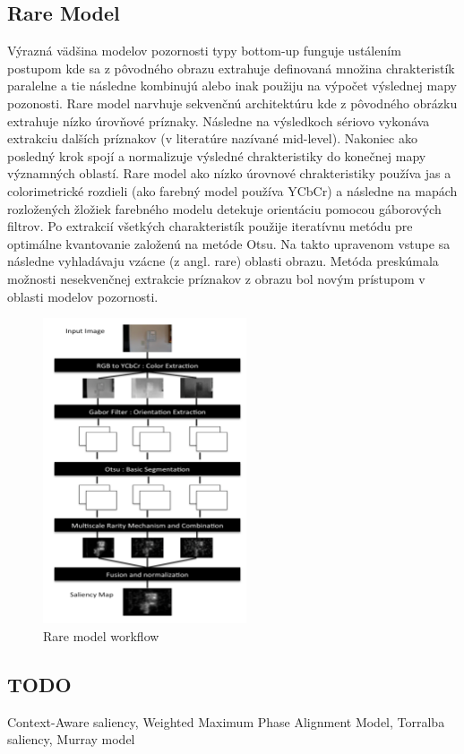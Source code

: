 \subsection{Rare Model}
Výrazná vädšina modelov pozornosti typy bottom-up funguje ustálením postupom kde sa z pôvodného obrazu extrahuje definovaná množina chrakteristík paralelne a tie následne kombinujú alebo inak použiju na výpočet výslednej mapy pozonosti. Rare model narvhuje sekvenčnú architektúru kde z pôvodného obrázku extrahuje nízko úrovňové príznaky. Následne na výsledkoch sériovo vykonáva extrakciu dalších príznakov (v literatúre nazívané mid-level). Nakoniec ako posledný krok spojí a normalizuje výsledné chrakteristiky do konečnej mapy významných oblastí. Rare model ako nízko úrovnové chrakteristiky používa jas a colorimetrické rozdieli (ako farebný model používa YCbCr) a následne na mapách rozložených žložiek farebného modelu detekuje orientáciu pomocou gáborových filtrov\cite{rare-1}. Po extrakcií všetkých charakteristík použije iteratívnu metódu pre optimálne kvantovanie založenú na metóde Otsu\cite{rare-2}. Na takto upravenom vstupe sa následne vyhladávaju vzácne (z angl. rare) oblasti obrazu. Metóda preskúmala možnosti nesekvenčnej extrakcie príznakov z obrazu bol novým prístupom v oblasti modelov pozornosti.

\begin{figure}[H]
  \centering
  \includegraphics[width=6cm]{pics/rare-1.png}
  \caption{Rare model workflow}\label{wrap-fig:3}
\end{figure}

\subsection{TODO}
Context-Aware saliency, Weighted Maximum Phase Alignment Model, Torralba saliency, Murray model

